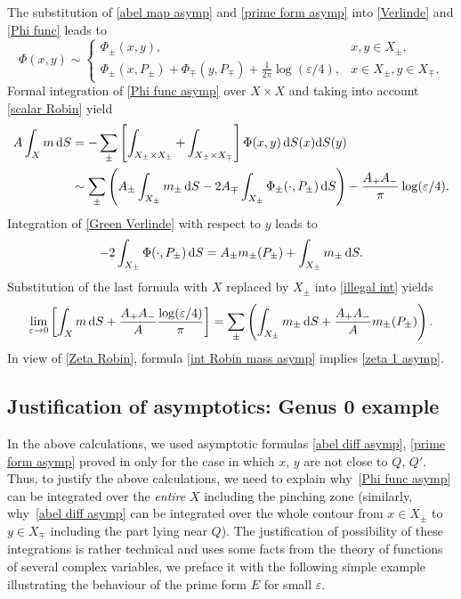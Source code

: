 \documentclass[pdftex]{sigma}
\numberwithin{equation}{section}
\theoremstyle{definition}
\begin{document}
The substitution of \eqref{abel map asymp} and \eqref{prime form asymp} into \eqref{Verlinde} and \eqref{Phi func} leads to
\begin{equation}
\label{Phi func asymp}
\Phi(x,y)\sim\begin{cases}
\Phi_\pm(x,y), & x,y\in X_\pm,\\
\Phi_\pm(x,P_\pm)+\Phi_\mp(y,P_\mp)+\frac{1}{2\pi}\log (\varepsilon/4), & x\in X_\pm, y\in X_\mp.
\end{cases}
\end{equation}
Formal integration of \eqref{Phi func asymp} over $X\times X$ and taking into account \eqref{scalar Robin} yield
\begin{align}
A\int_X m\, {\rm d }S&=-\sum_{\pm}\left[\int_{X_\pm\times X_\pm}+\int_{X_\pm\times X_\mp}\right]\Phi(x,y)\,{\rm d }S(x){\rm d }S(y)\nonumber\\
&\sim\sum_{\pm}\left(A_\pm\int_{X_\pm}m_\pm \,{\rm d }S-2A_\mp\int_{X_\pm}\Phi_\pm(\cdot,P_\pm)\,{\rm d }S\right)-\frac{A_+A_-}{\pi}\log (\varepsilon/4).\label{illegal int}
\end{align}
Integration of \eqref{Green Verlinde} with respect to $y$ leads to
\[-2\int_{X_\pm}\Phi(\cdot,P_\pm)\,{\rm d }S=A_\pm m_\pm(P_\pm)+\int_{X_\pm}m_\pm \, {\rm d }S.\]
Substitution of the last formula with $X$ replaced by $X_\pm$ into \eqref{illegal int} yields
\begin{equation}
\label{int Robin mass asymp}
\lim_{\varepsilon\to 0}\left[\int_X m\, {\rm d }S+\frac{A_+ A_-}{A}\frac{\log (\varepsilon/4)}{\pi}\right]=\sum_{\pm}\left(\int_{X_\pm}m_\pm \, {\rm d }S+\frac{A_+ A_-}{A}m_\pm (P_\pm)\right).
\end{equation}
In view of \eqref{Zeta Robin}, formula \eqref{int Robin mass asymp} implies \eqref{zeta 1 asymp}.

\subsection*{Justification of asymptotics: Genus 0 example} In the above calculations, we used asymptotic formulas \eqref{abel diff asymp}, \eqref{prime form asymp} proved in \cite{KokTAMS} only for the case in which $x$, $y$ are not close to $Q$, $Q'$. Thus, to justify the above calculations, we need to explain why~\eqref{Phi func asymp} can be integrated over the {\it entire} $X$ including the pinching zone (similarly, why~\eqref{abel diff asymp} can be integrated over the whole contour from $x\in X_\pm$ to $y\in X_\mp$ including the part lying near $Q$). The justification of possibility of these integrations is rather technical and uses some facts from the theory of functions of several complex variables, we preface it with the following simple example illustrating the behaviour of the prime form $E$ for small $\varepsilon$.
\end{document}
